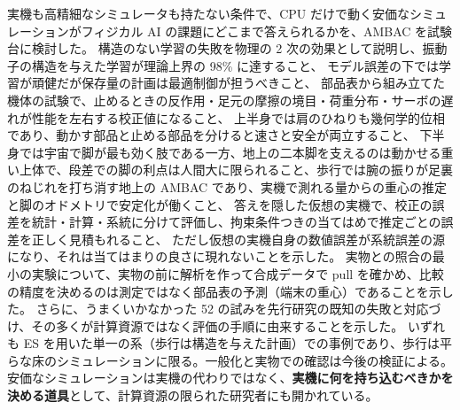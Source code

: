 \documentclass[paper=a4paper,fontsize=10pt,twocolumn,column_gap=2zw,line_length=24zw,number_of_lines=46,head_space=20mm]{jlreq}
\begin{document}
実機も高精細なシミュレータも持たない条件で、CPU だけで動く安価なシミュレーションがフィジカル AI の課題にどこまで答えられるかを、AMBAC を試験台に検討した。
構造のない学習の失敗を物理の 2 次の効果として説明し、振動子の構造を与えた学習が理論上界の 98\% に達すること、
モデル誤差の下では学習が頑健だが保存量の計画は最適制御が担うべきこと、
部品表から組み立てた機体の試験で、止めるときの反作用・足元の摩擦の境目・荷重分布・サーボの遅れが性能を左右する校正値になること、
上半身では肩のひねりも幾何学的位相であり、動かす部品と止める部品を分けると速さと安全が両立すること、
下半身では宇宙で脚が最も効く肢である一方、地上の二本脚を支えるのは動かせる重い上体で、段差での脚の利点は人間大に限られること、歩行では腕の振りが足裏のねじれを打ち消す地上の AMBAC であり、実機で測れる量からの重心の推定と脚のオドメトリで安定化が働くこと、
答えを隠した仮想の実機で、校正の誤差を統計・計算・系統に分けて評価し、拘束条件つきの当てはめで推定ごとの誤差を正しく見積もれること、
ただし仮想の実機自身の数値誤差が系統誤差の源になり、それは当てはまりの良さに現れないことを示した。
実物との照合の最小の実験について、実物の前に解析を作って合成データで pull を確かめ、比較の精度を決めるのは測定ではなく部品表の予測（端末の重心）であることを示した。
さらに、うまくいかなかった 52 の試みを先行研究の既知の失敗と対応づけ、その多くが計算資源ではなく評価の手順に由来することを示した。
いずれも ES を用いた単一の系（歩行は構造を与えた計画）での事例であり、歩行は平らな床のシミュレーションに限る。一般化と実物での確認は今後の検証による。
安価なシミュレーションは実機の代わりではなく、\textbf{実機に何を持ち込むべきかを決める道具}として、計算資源の限られた研究者にも開かれている。

\appendix
\end{document}
